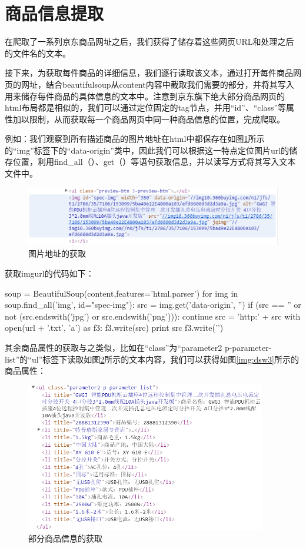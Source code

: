 \section{商品信息提取}
在爬取了一系列京东商品网址之后，我们获得了储存着这些网页URL和处理之后的文件名的文本。

接下来，为获取每件商品的详细信息，我们逐行读取该文本，通过打开每件商品网页的网址，结合beautifulsoup从content内容中截取我们需要的部分，并将其写入用来储存每件商品的具体信息的文本中。注意到京东旗下绝大部分商品网页的html布局都是相似的，我们可以通过定位固定的tag节点，并用“id”、“class”等属性加以限制，从而获取每一个商品网页中同一种商品信息的位置，完成爬取。

例如：我们观察到所有描述商品的图片地址在html中都保存在如图\ref{img:dsw1}所示的“img”标签下的“data-origin”类中，因此我们可以根据这一特点定位图片url的储存位置，利用find\_all（）、get（）等语句获取信息，并以读写方式将其写入文本文件中。

\begin{figure}[htbp]
\centering
\includegraphics[width=13.5cm]{img/dsw/dsw1.png}
\caption{图片地址的获取}
\label{img:dsw1}
\end{figure}

获取imgurl的代码如下：
\begin{python}
    soup = BeautifulSoup(content,features='html.parser')
    for img in soup.find_all('img', id="spec-img"):
        src = img.get('data-origin', '')
        if (src == '' or not (src.endswith('jpg') or src.endswith('png'))):
            continue
        src = 'http:' + src
        with open(url + '.txt', 'a') as f3:
            f3.write(src)
            print src
            f3.write('\n')
\end{python}

其余商品属性的获取与之类似，比如在“class”为“parameter2 p-parameter-list”的“ul”标签下读取如图\ref{img:dsw2}所示的文本内容，我们可以获得如图\ref{img:dsw3}所示的商品属性：

\begin{figure}[htbp]
\centering
\includegraphics[width=10.5cm]{img/dsw/dsw2.png}
\caption{部分商品信息的获取}
\label{img:dsw2}
\end{figure}

